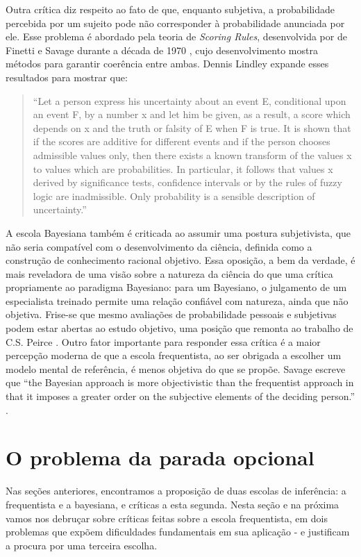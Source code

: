 Outra crítica diz respeito ao fato de que, enquanto subjetiva, a probabilidade percebida por um sujeito pode não corresponder
à probabilidade anunciada por ele. Esse problema é abordado pela teoria de {\em Scoring Rules}, desenvolvida por
de Finetti e Savage durante a década de 1970 \citep{Lindley82}, cujo
desenvolvimento mostra métodos para garantir coerência entre ambas. Dennis Lindley expande esses resultados para mostrar que:

\begin{quote}
``Let a person express his uncertainty about an event E, conditional upon an event F, by a number x and let him be given, 
as a result, a score which depends on x and the truth or falsity of E when F is true. It is shown that if the scores are 
additive for different events and if the person chooses admissible values only, then there exists a known transform of the 
values x to values which are probabilities. In particular, it follows that values x derived by significance tests, confidence 
intervals or by the rules of fuzzy logic are inadmissible. Only probability is a sensible description of uncertainty.''
\citep{Lindley82}
\end{quote}

A escola Bayesiana também é criticada ao assumir uma postura subjetivista, que não seria compatível com o desenvolvimento
da ciência, definida como a construção de conhecimento racional objetivo. Essa oposição, a bem da verdade, é mais reveladora
de uma visão sobre a natureza da ciência do que uma crítica propriamente ao paradigma Bayesiano:
para um Bayesiano, o julgamento de um especialista treinado permite uma relação confiável com natureza, 
ainda que não objetiva. Frise-se que mesmo avaliações de probabilidade pessoais e subjetivas podem estar abertas 
ao estudo objetivo, uma posição que remonta ao trabalho
de C.S. Peirce \citep{Stigler78}.  Outro fator importante para responder essa crítica é a maior percepção moderna
de que a escola frequentista, ao ser obrigada a escolher um modelo mental de referência, é menos objetiva do que se propõe.
Savage escreve que ``the Bayesian approach is more objectivistic than the frequentist approach in that it imposes a greater
order on the subjective elements of the deciding person.'' \citep{Savage60}.

\section{O problema da parada opcional} 

Nas seções anteriores, encontramos a proposição de duas escolas de inferência: a frequentista e a bayesiana, e críticas
a esta segunda. Nesta seção e na próxima vamos nos debruçar sobre críticas feitas sobre a escola frequentista, em dois
problemas que expõem dificuldades fundamentais em sua aplicação - e justificam a procura por uma terceira escolha.

